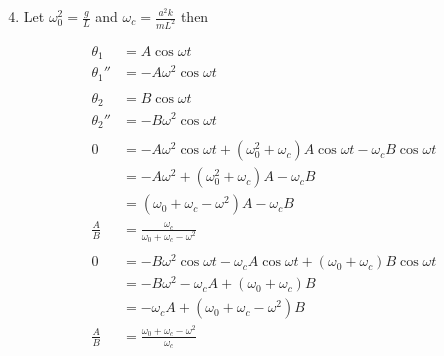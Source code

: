 \documentclass{article}
\begin{document}
\begin{enumerate}
        \setcounter{enumi}{3}
  \item

        Let $\omega_0^2 = \frac{g}{L}$ and $\omega_c = \frac{a^2 k}{m L^2}$ then

        \begin{align*}
          \theta_1    & = A \cos \omega t                                                                                \\
          \theta_1''  & = -A \omega^2 \cos \omega t                                                                      \\ \\
          \theta_2    & = B \cos \omega t                                                                                \\
          \theta_2''  & = -B \omega^2 \cos \omega t                                                                      \\ \\
          0           & = -A \omega^2 \cos \omega t + (\omega_0^2 + \omega_c) A \cos \omega t - \omega_c B \cos \omega t \\
                      & = -A \omega^2 + (\omega_0^2 + \omega_c) A - \omega_c B                                           \\
                      & = (\omega_0 + \omega_c - \omega^2) A - \omega_c B                                                \\
          \frac{A}{B} & = \frac{\omega_c}{\omega_0 + \omega_c - \omega^2}                                                \\ \\
          0           & = -B \omega^2 \cos \omega t - \omega_c A \cos \omega t + (\omega_0 + \omega_c) B \cos \omega t   \\
                      & = -B \omega^2 - \omega_c A + (\omega_0 + \omega_c) B                                             \\
                      & = -\omega_c A + (\omega_0 + \omega_c - \omega^2) B                                               \\
          \frac{A}{B} & = \frac{\omega_0 + \omega_c - \omega^2}{\omega_c}
        \end{align*}


\end{enumerate}
\end{document}
